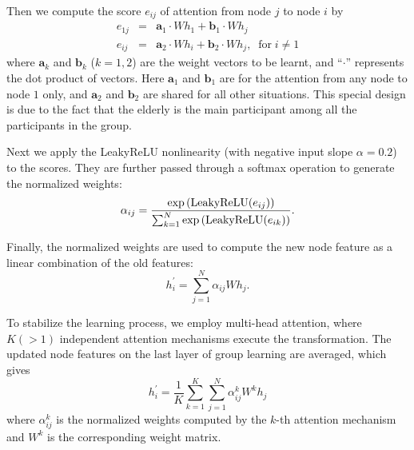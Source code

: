 \documentclass[VANCOUVER,STIX1COL]{WileyNJD-v2}
\begin{document}
Then we compute the score $e_{ij}$ of attention from node $j$ to node $i$ by
\begin{eqnarray}
e_{1j} &=& \mathbf{a}_1\cdot W h_1 +   \mathbf{b}_1 \cdot W h_j \\
e_{ij} &=& \mathbf{a}_2\cdot W h_i +   \mathbf{b}_2 \cdot W h_j, \;\; \text{for}\; i \neq 1
\end{eqnarray}
where $\mathbf{a}_k$ and $\mathbf{b}_k$ ($k=1,2$) are the weight vectors to be learnt, and ``$\cdot$'' represents the dot product of vectors. Here $\mathbf{a}_1$ and $\mathbf{b}_1$ are  for the attention from any node to node $1$ only, and  $\mathbf{a}_2$ and $\mathbf{b}_2$ are shared for all other situations. This special design is due to the fact that the elderly is the main participant among all the participants in the group.

Next we apply the LeakyReLU nonlinearity (with negative input slope $\alpha = 0.2$) to the scores. They are further passed through a softmax operation to generate the normalized weights:
\begin{equation}
    \alpha_{ij} = \frac{{\rm exp}\left({\rm LeakyReLU}(e_{ij})\right)}{\sum_{k=1}^{N}{\rm exp}\left({\rm LeakyReLU}(e_{ik})\right)}.
\end{equation}


Finally, the normalized weights are used to compute the new node feature as a linear combination of the old features:
\begin{equation}
  h_i^{\prime} = \sum\limits_{j=1}^{N} \alpha_{ij}W h_j.
\end{equation}

To stabilize the learning process, we employ multi-head attention, where $K (>1)$ independent attention mechanisms execute the transformation. The updated node features on the last layer of group learning are averaged, which gives
\begin{equation}
  h_i^{\prime} = \frac{1}{K}\sum\limits_{k=1}^K \sum\limits_{j=1}^N \alpha_{ij}^k W^k h_j
\end{equation}
where $\alpha_{ij}^k$ is the normalized weights computed by the $k$-th attention mechanism and $W^k$ is the corresponding weight matrix.
\end{document}
